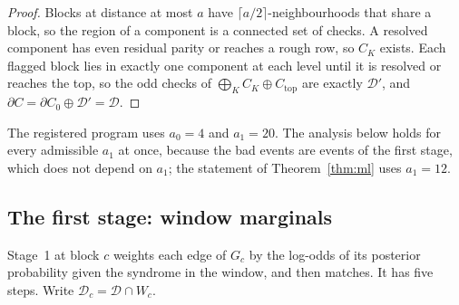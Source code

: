 \documentclass[11pt]{amsart}
\theoremstyle{definition}
\theoremstyle{remark}
\numberwithin{equation}{section}
\newcommand{\cD}{\mathcal{D}}
\begin{document}
\begin{proof}
Blocks at distance at most $a$ have $\lceil a/2\rceil$-neighbourhoods that share a block, so the region of a component is a connected set of checks. A resolved component has even residual parity or reaches a rough row, so $C_K$ exists. Each flagged block lies in exactly one component at each level until it is resolved or reaches the top, so the odd checks of $\bigoplus_K C_K\oplus C_{\mathrm{top}}$ are exactly $\cD'$, and $\partial C=\partial C_0\oplus\cD'=\cD$.
\end{proof}

The registered program uses $a_0=4$ and $a_1=20$. The analysis below holds for every admissible $a_1$ at once, because the bad events are events of the first stage, which does not depend on $a_1$; the statement of Theorem~\ref{thm:ml} uses $a_1=12$.

\subsection{The first stage: window marginals}\label{sec:cert-marg}
Stage~1 at block $c$ weights each edge of $G_c$ by the log-odds of its posterior probability given the syndrome in the window, and then matches. It has five steps. Write $\cD_c=\cD\cap W_c$.
\end{document}
